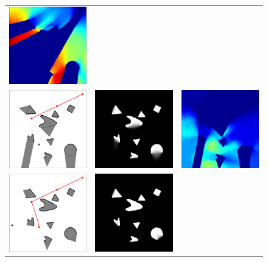 \begin{figure}
\begin{tabular}{ccc}
\includegraphics[width=1.5in]{2D/energy_01}\\
\includegraphics[width=1.5in]{2D/scene_03}&
\includegraphics[width=1.5in]{2D/marginal_03}&
\includegraphics[width=1.5in]{2D/energy_03}\\
\includegraphics[width=1.5in]{2D/scene_04}&
\includegraphics[width=1.5in]{2D/marginal_04}&

\end{tabular}
\end{figure}
